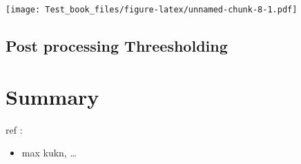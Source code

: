 \documentclass[
]{report}
\providecommand{\tightlist}{%
  \setlength{\itemsep}{0pt}\setlength{\parskip}{0pt}}
\begin{document}
\texttt{[image: Test\_book\_files/figure-latex/unnamed-chunk-8-1.pdf]}

\hypertarget{post-processing-threesholding}{%
\section{Post processing Threesholding}\label{post-processing-threesholding}}

\hypertarget{summary}{%
\chapter{Summary}\label{summary}}

ref :

\begin{itemize}
\tightlist
\item
  max kukn, \ldots{}
\end{itemize}

  
\end{document}
